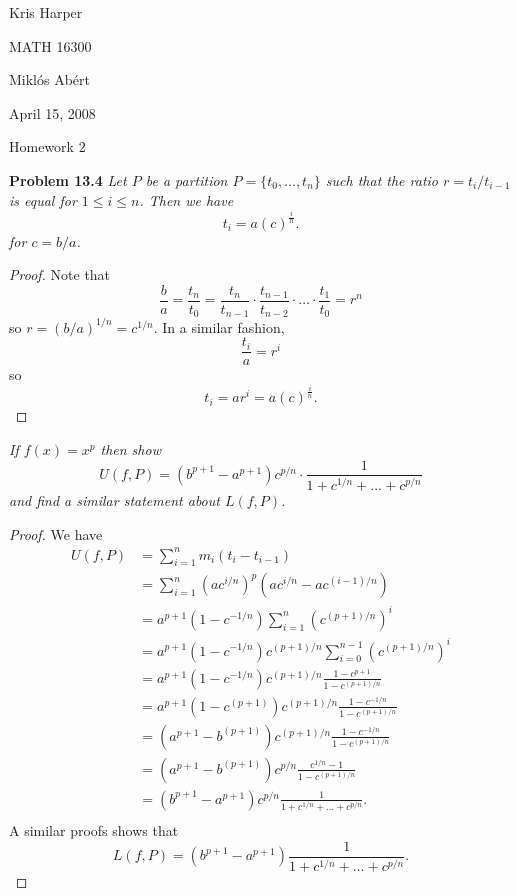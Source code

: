 \documentclass{article}
\begin{document}
\begin{flushright}
Kris Harper

MATH 16300

Mikl\'{o}s Ab\'{e}rt

April 15, 2008
\end{flushright}

\begin{center}
Homework 2
\end{center}

\begin{flushleft}

\textbf{Problem 13.4}
\textsl{Let $P$ be a partition $P=\{t_0, \dots , t_n\}$ such that the ratio $r=t_i/t_{i-1}$ is equal for $1 \leq i \leq n$. Then we have
\[
t_i = a \left ( c \right )^{\frac{i}{n}}.
\]
for $c=b/a$.}
\begin{proof}
Note that
\[
\frac{b}{a} = \frac{t_n}{t_0} = \frac{t_n}{t_{n-1}} \cdot \frac{t_{n-1}}{t_{n-2}} \cdot \dots \cdot \frac{t_1}{t_0} = r^n
\]
so $r=(b/a)^{1/n}=c^{1/n}$. In a similar fashion,
\[
\frac{t_i}{a}=r^i
\]
so
\[
t_i = a r^i = a \left ( c \right )^{\frac{i}{n}}.
\]
\end{proof}

\textsl{If $f(x) = x^p$ then show
\[
U(f,P) = (b^{p+1} - a^{p+1}) c^{p/n} \cdot \frac{1}{1+c^{1/n} + \dots + c^{p/n}}
\]
and find a similar statement about $L(f,P)$.}
\begin{proof}
We have
\begin{align*}
U(f,P) &= \sum_{i=1}^n m_i(t_i-t_{i-1}) \\
	  &= \sum_{i=1}^n \left ( ac^{i/n} \right )^p \left ( ac^{i/n} - ac^{(i-1)/n} \right ) \\
	  &= a^{p+1}(1-c^{-1/n}) \sum_{i=1}^n \left (c^{(p+1)/n} \right )^i \\
	  &= a^{p+1}(1-c^{-1/n}) c^{(p+1)/n} \sum_{i=0}^{n-1} \left (c^{(p+1)/n} \right )^i \\
	  &= a^{p+1}(1-c^{-1/n}) c^{(p+1)/n} \frac{1 - c^{p+1}}{1 - c^{(p+1)/n}} \\
	  &= a^{p+1}(1-c^{(p+1)}) c^{(p+1)/n} \frac{1 - c^{-1/n}}{1 - c^{(p+1)/n}} \\
	  &= (a^{p+1}-b^{(p+1)}) c^{(p+1)/n} \frac{1 - c^{-1/n}}{1 - c^{(p+1)/n}} \\
	  &= (a^{p+1}-b^{(p+1)}) c^{p/n} \frac{c^{1/n} -1}{1 - c^{(p+1)/n}} \\
	  &= (b^{p+1}-a^{p+1})c^{p/n} \frac{1}{1+c^{1/n}+ \dots + c^{p/n}}.\\
\end{align*}
A similar proofs shows that
\[
L(f,P)=(b^{p+1}-a^{p+1}) \frac{1}{1+c^{1/n}+ \dots + c^{p/n}}.
\]
\end{proof}


\end{flushleft}
\end{document}
